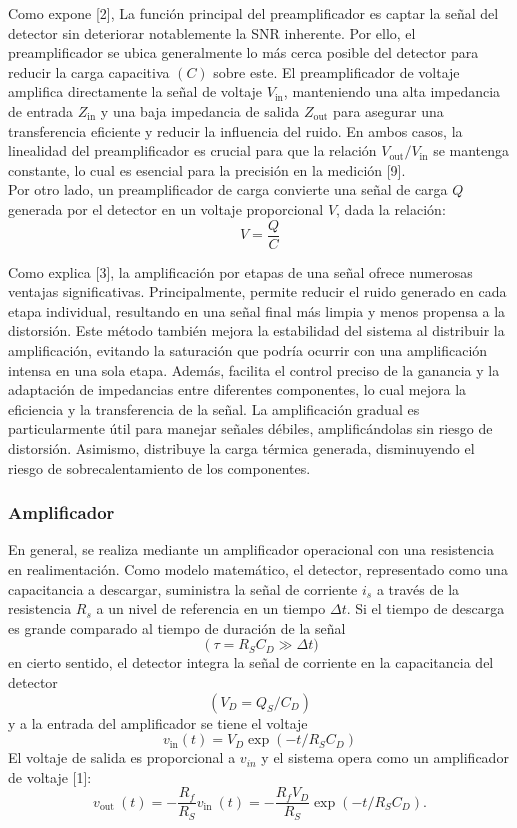 \documentclass[]{book}
\begin{document}
\noindent Como expone [2], La función principal del preamplificador es captar la señal del detector sin deteriorar notablemente la SNR inherente. Por ello, el preamplificador se ubica generalmente lo más cerca posible del detector para reducir la carga capacitiva $(C)$ sobre este. El preamplificador de voltaje amplifica directamente la señal de voltaje $V_{\text{in}}$, manteniendo una alta impedancia de entrada $Z_{\text{in}}$ y una baja impedancia de salida $Z_{\text{out}}$ para asegurar una transferencia eficiente y reducir la influencia del ruido. En ambos casos, la linealidad del preamplificador es crucial para que la relación $V_{\text{out}}/ V_{\text{in}}$ se mantenga constante, lo cual es esencial para la precisión en la medición [9].\\

\noindent Por otro lado, un preamplificador de carga convierte una señal de carga $Q$ generada por el detector en un voltaje proporcional $V$, dada la relación: $$V = \frac{Q}{C}$$

\noindent Como explica [3], la amplificación por etapas de una señal ofrece numerosas ventajas significativas. Principalmente, permite reducir el ruido generado en cada etapa individual, resultando en una señal final más limpia y menos propensa a la distorsión. Este método también mejora la estabilidad del sistema al distribuir la amplificación, evitando la saturación que podría ocurrir con una amplificación intensa en una sola etapa. Además, facilita el control preciso de la ganancia y la adaptación de impedancias entre diferentes componentes, lo cual mejora la eficiencia y la transferencia de la señal. La amplificación gradual es particularmente útil para manejar señales débiles, amplificándolas sin riesgo de distorsión. Asimismo, distribuye la carga térmica generada, disminuyendo el riesgo de sobrecalentamiento de los componentes. \\

\subsubsection{Amplificador}

\noindent En general, se realiza mediante un amplificador operacional con una resistencia en realimentación. Como modelo matemático, el detector, representado como una capacitancia a descargar, suministra la señal de corriente $i_{s}$ a través de la resistencia $R_{s}$ a un nivel de referencia en un tiempo $\Delta t$. Si el tiempo de descarga es grande comparado al tiempo de duración de la señal $$\left(\tau=R_S C_D \gg\right. \Delta t)$$ en cierto sentido, el detector integra la señal de corriente en la capacitancia del detector $$\left(V_D=Q_S / C_D\right)$$ y a la entrada del amplificador se tiene el voltaje $$v_{\text{in}}(t)=V_D \exp \left(-t / R_S C_D\right)$$ El voltaje de salida es proporcional a $v_{i n}$ y el sistema opera como un amplificador de voltaje [1]:
$$
v_{\text {out }}(t)=-\frac{R_f}{R_S} v_{\text {in }}(t)=-\frac{R_f V_D}{R_S} \exp \left(-t / R_S C_D\right) .
$$
\end{document}
